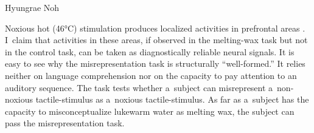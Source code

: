 \begin{artengenv}{Hyungrae Noh}



Noxious hot (46°C) stimulation produces localized activities in prefrontal areas
\parencite[][]{tracey_noxious_2000}. %
 I~claim that activities in these areas, if observed in the melting-wax task but not in the control task, can be taken as diagnostically reliable neural signals. It is easy to see why the misrepresentation task is structurally ``well-formed.'' It relies neither on language comprehension nor on the capacity to pay attention to an auditory sequence. The task tests whether a~subject can misrepresent a~non-noxious tactile-stimulus as a~noxious tactile-stimulus. As far as a~subject has the capacity to misconceptualize lukewarm water as melting wax, the subject can pass the misrepresentation task.


\end{artengenv}
